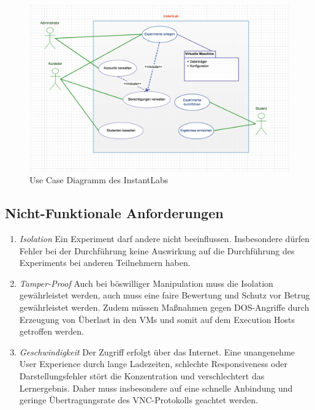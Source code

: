 			\begin{figure}[h]
				\begin{center}
					\includegraphics[width=\textwidth]{img/usecases}
					\caption{Use Case Diagramm des InstantLabs}
					\label{fig:instantlab-usecases}
				\end{center}
			\end{figure}


		\subsection{Nicht-Funktionale Anforderungen}

		\begin{enumerate}
			\item \emph{Isolation} Ein Experiment darf andere nicht beeinflussen. Insbesondere dürfen Fehler bei der Durchführung keine Auswirkung auf die Durchführung des Experiments bei anderen Teilnehmern haben.
			\item \emph{Tamper-Proof} Auch bei böswilliger Manipulation muss die Isolation gewährleistet werden, auch muss eine faire Bewertung und Schutz vor Betrug gewährleistet werden. Zudem müssen Maßnahmen gegen DOS-Angriffe durch Erzeugung von Überlast in den VMs und somit auf dem Execution Hosts getroffen werden. 
			\item \emph{Geschwindigkeit} Der Zugriff erfolgt über das Internet. Eine unangenehme User Experience durch lange Ladezeiten, schlechte Responsiveness oder Darstellungsfehler stört die Konzentration und verschlechtert das Lernergebnis. Daher muss insbesondere auf eine schnelle Anbindung und geringe Übertragungsrate des VNC-Protokolls geachtet werden.
		\end{enumerate}
	

